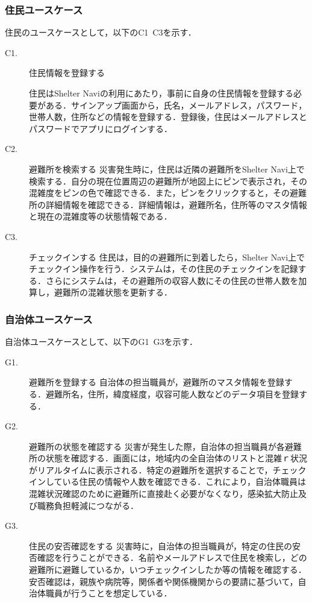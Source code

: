 \documentclass[technicalreport,dvipdfmx]{ieicej}
\begin{document}
\subsubsection{住民ユースケース}
住民のユースケースとして，以下のC1~C3を示す．
\begin{description}
     \item[C1.] 住民情報を登録する
     
     住民はShelter Naviの利用にあたり，事前に自身の住民情報を登録する必要がある．サインアップ画面から，氏名，メールアドレス，パスワード，世帯人数，住所などの情報を登録する．登録後，住民はメールアドレスとパスワードでアプリにログインする．

     \item[C2.] 避難所を検索する
     災害発生時に，住民は近隣の避難所をShelter Navi上で検索する．自分の現在位置周辺の避難所が地図上にピンで表示され，その混雑度をピンの色で確認できる．また，ピンをクリックすると，その避難所の詳細情報を確認できる．詳細情報は，避難所名，住所等のマスタ情報と現在の混雑度等の状態情報である．

     \item[C3.] チェックインする
     住民は，目的の避難所に到着したら，Shelter Navi上でチェックイン操作を行う．システムは，その住民のチェックインを記録する．さらにシステムは，その避難所の収容人数にその住民の世帯人数を加算し，避難所の混雑状態を更新する．
\end{description}

\subsubsection{自治体ユースケース}
自治体ユースケースとして、以下のG1~G3を示す．

\begin{description}
     \item[G1.] 避難所を登録する
     自治体の担当職員が，避難所のマスタ情報を登録する．避難所名，住所，緯度経度，収容可能人数などのデータ項目を登録する．

     \item[G2.] 避難所の状態を確認する
     災害が発生した際，自治体の担当職員が各避難所の状態を確認する．画面には，地域内の全自治体のリストと混雑ｒ状況がリアルタイムに表示される．特定の避難所を選択することで，チェックインしている住民の情報や人数を確認できる．これにより，自治体職員は混雑状況確認のために避難所に直接赴く必要がなくなり，感染拡大防止及び職務負担軽減につながる．

     \item[G3.] 住民の安否確認をする
     災害時に，自治体の担当職員が，特定の住民の安否確認を行うことができる．名前やメールアドレスで住民を検索し，どの避難所に避難しているか，いつチェックインしたか等の情報を確認する．安否確認は，親族や病院等，関係者や関係機関からの要請に基づいて，自治体職員が行うことを想定している．
\end{description}
\end{document}
